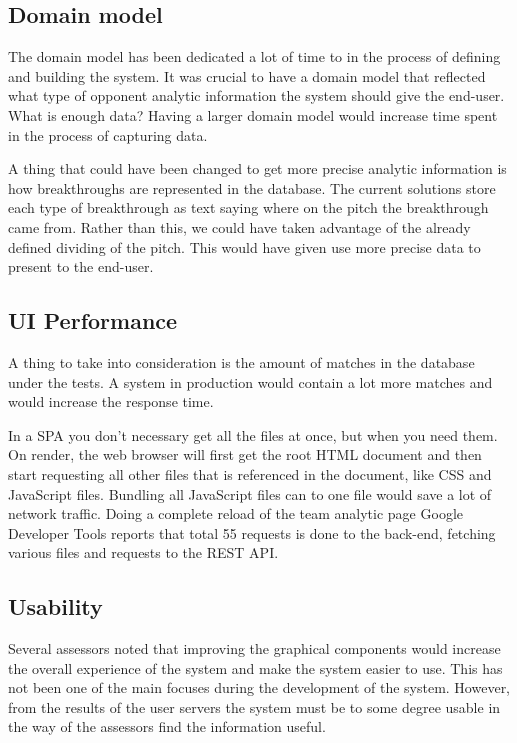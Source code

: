 \subsection{Domain model}
The domain model has been dedicated a lot of time to in the process of defining and building the system. It was crucial to have a domain model that reflected what type of opponent analytic information the system should give the end-user. What is enough data? Having a larger domain model would increase time spent in the process of capturing data. 

A thing that could have been changed to get more precise analytic information is how breakthroughs are represented in the database. The current solutions store each type of breakthrough as text saying where on the pitch the breakthrough came from. Rather than this, we could have taken advantage of the already defined dividing of the pitch. This would have given use more precise data to present to the end-user.

\subsection{UI Performance}

A thing to take into consideration is the amount of matches in the database under the tests. A system in production would contain a lot more matches and would increase the response time. 


In a \ac{SPA} you don't necessary get all the files at once, but when you need them. On render, the web browser will first get the root \ac{HTML} document and then start requesting all other files that is referenced in the document, like \ac{CSS} and JavaScript files. Bundling all JavaScript files can to one file would save a lot of network traffic. Doing a complete reload of the team analytic page Google Developer Tools reports that total 55 requests is done to the back-end, fetching various files and requests to the REST API.

\subsection{Usability}

Several assessors noted that improving the graphical components would increase the overall experience of the system and make the system easier to use. This has not been one of the main focuses during the development of the system. However, from the results of the user servers the system must be to some degree usable in the way of the assessors find the information useful. 





